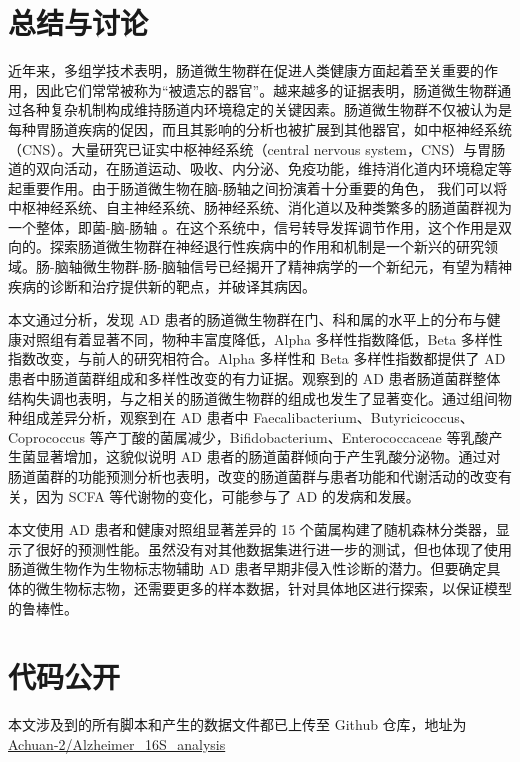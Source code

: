\documentclass[supercite]{HustGraduPaper}
\begin{document}
\section{总结与讨论}

近年来，多组学技术表明，肠道微生物群在促进人类健康方面起着至关重要的作用，因此它们常常被称为“被遗忘的器官”。越来越多的证据表明，肠道微生物群通过各种复杂机制构成维持肠道内环境稳定的关键因素\cite{wang2019sodium}\cite{la2018gut}\cite{mayer2015gut}。肠道微生物群不仅被认为是每种胃肠道疾病的促因，而且其影响的分析也被扩展到其他器官，如中枢神经系统（CNS）。大量研究已证实中枢神经系统（central nervous system，CNS）与胃肠道的双向活动，在肠道运动、吸收、内分泌、免疫功能，维持消化道内环境稳定等起重要作用。由于肠道微生物在脑-肠轴之间扮演着十分重要的角色， 我们可以将中枢神经系统、自主神经系统、肠神经系统、消化道以及种类繁多的肠道菌群视为一个整体，即菌-脑-肠轴 \cite{cryan2019microbiota} 。在这个系统中，信号转导发挥调节作用，这个作用是双向的。探索肠道微生物群在神经退行性疾病中的作用和机制是一个新兴的研究领域。肠-脑轴微生物群-肠-脑轴信号已经揭开了精神病学的一个新纪元，有望为精神疾病的诊断和治疗提供新的靶点，并破译其病因。

本文通过分析，发现 AD 患者的肠道微生物群在门、科和属的水平上的分布与健康对照组有着显著不同，物种丰富度降低，Alpha 多样性指数降低，Beta 多样性指数改变，与前人的研究相符合。Alpha 多样性和 Beta  多样性指数都提供了 AD 患者中肠道菌群组成和多样性改变的有力证据。观察到的 AD 患者肠道菌群整体结构失调也表明，与之相关的肠道微生物群的组成也发生了显著变化。通过组间物种组成差异分析，观察到在 AD 患者中 Faecalibacterium、Butyricicoccus、Coprococcus 等产丁酸的菌属减少，Bifidobacterium、Enterococcaceae 等乳酸产生菌显著增加，这貌似说明 AD 患者的肠道菌群倾向于产生乳酸分泌物。通过对肠道菌群的功能预测分析也表明，改变的肠道菌群与患者功能和代谢活动的改变有关，因为 SCFA 等代谢物的变化，可能参与了 AD 的发病和发展。


本文使用 AD 患者和健康对照组显著差异的 15 个菌属构建了随机森林分类器，显示了很好的预测性能。虽然没有对其他数据集进行进一步的测试，但也体现了使用肠道微生物作为生物标志物辅助 AD 患者早期非侵入性诊断的潜力。但要确定具体的微生物标志物，还需要更多的样本数据，针对具体地区进行探索，以保证模型的鲁棒性。


\section{代码公开}

本文涉及到的所有脚本和产生的数据文件都已上传至 Github 仓库，地址为\href{https://github.com/Achuan-2/Alzheimer_16S_analysis}{Achuan-2/Alzheimer\_16S\_analysis}
\end{document}
